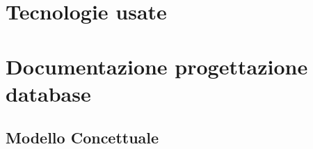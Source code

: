 \documentclass[paper=a4, fontsize=11pt]{scrartcl} %
\numberwithin{equation}{section} %
\numberwithin{figure}{section} %
\numberwithin{table}{section} %
\begin{document}
\section{Tecnologie usate}

\section{Documentazione progettazione database}
\subsection*{Modello Concettuale}



    \begin{figure}[htbp]
        \centering

        \qquad\qquad\qquad\qquad\qquad\qquad\qquad\qquad

        \qquad\qquad
      \end{figure}
\end{document}
